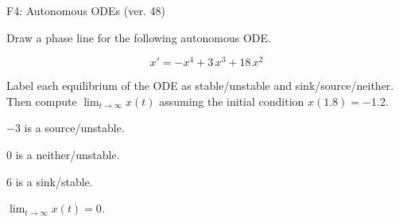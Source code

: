 \begin{exercise}
  \begin{exerciseTitle}F4: Autonomous ODEs (ver. 48)\end{exerciseTitle}
  \begin{exerciseStatement}
    

      Draw a phase line for the following 
      autonomous ODE.
    

    
\[x'= -x^{4} + 3 \, x^{3} + 18 \, x^{2}\]

    

      Label each equilibrium of the ODE
      as stable/unstable and sink/source/neither.
      Then compute \(\lim_{t\to\infty}x(t)\)
      assuming the initial condition
      \(x( 1.8 )= -1.2\).
    

  \end{exerciseStatement}
  \begin{exerciseAnswer}
    

      \(-3\) is a source/unstable.
      
        \(0\) is a neither/unstable.
      
      \(6\) is a sink/stable.
    

    

      \(\lim_{t\to\infty}x(t)=0\).
    

  \end{exerciseAnswer}
\end{exercise}